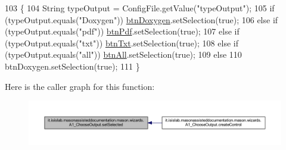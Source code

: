 \begin{DoxyCode}
103                                \{
104         String typeOutput = ConfigFile.getValue(\textcolor{stringliteral}{"typeOutput"});
105         \textcolor{keywordflow}{if} (typeOutput.equals(\textcolor{stringliteral}{"Doxygen"}))   \hyperlink{classit_1_1isislab_1_1masonassisteddocumentation_1_1mason_1_1wizards_1_1_a1___choose_output_a64285d7a7afd8d13b8da8dfc76d8c524}{btnDoxygen}.setSelection(\textcolor{keyword}{true});
106         \textcolor{keywordflow}{else} \textcolor{keywordflow}{if} (typeOutput.equals(\textcolor{stringliteral}{"pdf"}))  \hyperlink{classit_1_1isislab_1_1masonassisteddocumentation_1_1mason_1_1wizards_1_1_a1___choose_output_a9b810d24e36dd0e722f76a0f0a9b064b}{btnPdf}.setSelection(\textcolor{keyword}{true});
107         \textcolor{keywordflow}{else} \textcolor{keywordflow}{if} (typeOutput.equals(\textcolor{stringliteral}{"txt"}))  \hyperlink{classit_1_1isislab_1_1masonassisteddocumentation_1_1mason_1_1wizards_1_1_a1___choose_output_a7a3e59d93bfba5d422c70ffdaf34f8ae}{btnTxt}.setSelection(\textcolor{keyword}{true});
108         \textcolor{keywordflow}{else} \textcolor{keywordflow}{if} (typeOutput.equals(\textcolor{stringliteral}{"all"}))  \hyperlink{classit_1_1isislab_1_1masonassisteddocumentation_1_1mason_1_1wizards_1_1_a1___choose_output_aebfe811a15807a6648df6d7cb9ce1196}{btnAll}.setSelection(\textcolor{keyword}{true});
109         \textcolor{keywordflow}{else}
110             btnDoxygen.setSelection(\textcolor{keyword}{true});
111     \}
\end{DoxyCode}


Here is the caller graph for this function\-:\nopagebreak
\begin{figure}[H]
\begin{center}
\leavevmode
\includegraphics[width=350pt]{classit_1_1isislab_1_1masonassisteddocumentation_1_1mason_1_1wizards_1_1_a1___choose_output_a4602f301eef9ed9fbb73ef78b00ae401_icgraph}
\end{center}
\end{figure}




